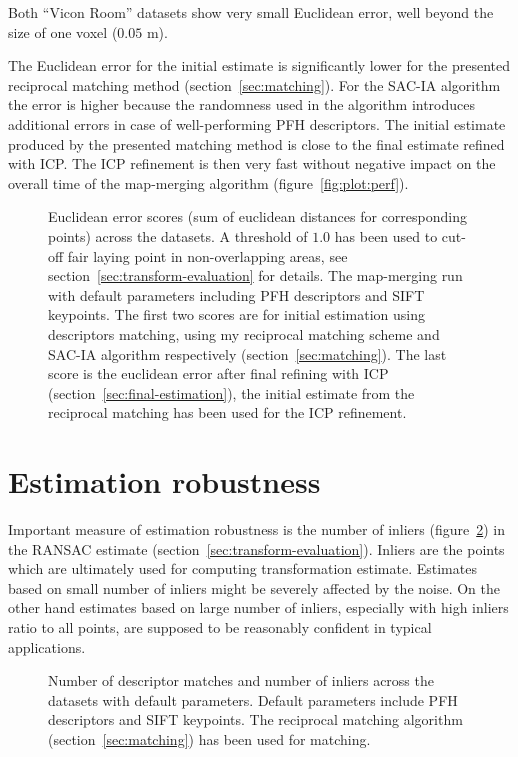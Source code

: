 Both ``Vicon Room'' datasets show very small Euclidean error, well beyond the size of one voxel ($0.05$ m).

The Euclidean error for the initial estimate is significantly lower for the presented reciprocal matching method (section~\ref{sec:matching}). For the \gls{SAC-IA} algorithm the error is higher because the randomness used in the algorithm introduces additional errors in case of well-performing \gls{PFH} descriptors. The initial estimate produced by the presented matching method is close to the final estimate refined with \gls{ICP}. The \gls{ICP} refinement is then very fast without negative impact on the overall time of the map-merging algorithm (figure~\ref{fig:plot:perf}).

\begin{figure}
  \centering
  
  \caption{Euclidean error scores (sum of euclidean distances for corresponding points) across the datasets. A threshold of $1.0$ has been used to cut-off fair laying point in non-overlapping areas, see section~\ref{sec:transform-evaluation} for details. The map-merging run with default parameters including \gls{PFH} descriptors and \gls{SIFT} keypoints. The first two scores are for initial estimation using descriptors matching, using my reciprocal matching scheme and \gls{SAC-IA} algorithm respectively (section~\ref{sec:matching}). The last score is the euclidean error after final refining with \gls{ICP} (section~\ref{sec:final-estimation}), the initial estimate from the reciprocal matching has been used for the \gls{ICP} refinement.}
  \label{fig:plot:euc_dist}
\end{figure}

\section{Estimation robustness}

Important measure of estimation robustness is the number of inliers (figure~\ref{fig:plot:inliers}) in the \gls{RANSAC} estimate (section~\ref{sec:transform-evaluation}). Inliers are the points which are ultimately used for computing transformation estimate. Estimates based on small number of inliers might be severely affected by the noise. On the other hand estimates based on large number of inliers, especially with high inliers ratio to all points, are supposed to be reasonably confident in typical applications.



\begin{figure}
  \centering
  
  \caption{Number of descriptor matches and number of inliers across the datasets with default parameters. Default parameters include \gls{PFH} descriptors and \gls{SIFT} keypoints. The reciprocal matching algorithm (section~\ref{sec:matching}) has been used for matching.}
  \label{fig:plot:inliers}
\end{figure}

